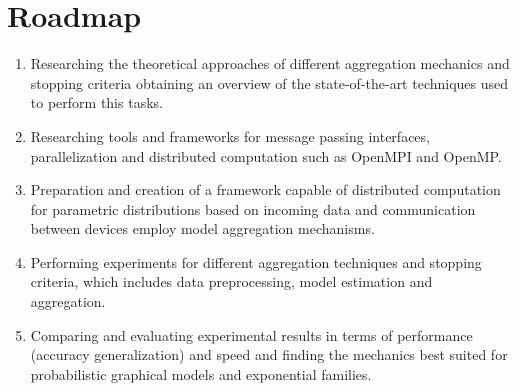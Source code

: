   \section{Roadmap}
  \begin{enumerate}
       \item Researching the theoretical approaches of different aggregation mechanics and stopping criteria obtaining an overview of the state-of-the-art techniques used to perform this tasks.
       \item Researching tools and frameworks for message passing interfaces, parallelization and distributed computation such as OpenMPI\cite{gabriel04:_open_mpi} and OpenMP.
       \item Preparation and creation of a framework capable of distributed computation for parametric distributions based on incoming data and communication between devices employ model aggregation mechanisms.
       \item Performing experiments for different aggregation techniques and stopping criteria, which includes data preprocessing, model estimation and aggregation.
       \item Comparing and evaluating experimental results in terms of performance (accuracy generalization) and speed and finding the mechanics best suited for probabilistic graphical models and exponential families.
    \end{enumerate}